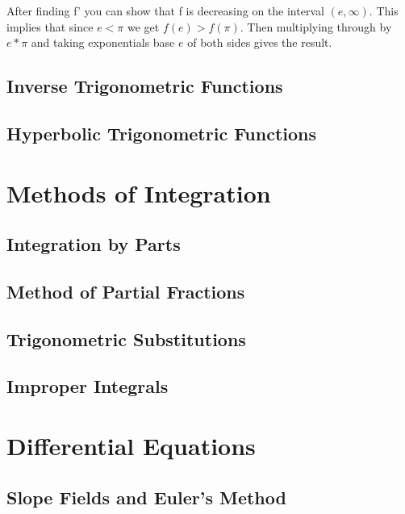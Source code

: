 \documentclass{amsbook}
\begin{document}
\begin{Answer}[ref={7c1}]
After finding f' you can show that f is decreasing on the interval $(e,\infty)$. This implies that since $e<\pi$ we get $f(e)>f(\pi)$. Then multiplying through by $e*\pi$ and taking exponentials base $e$ of both sides gives the result.
\end{Answer}



\section{Inverse Trigonometric Functions}

\section{Hyperbolic Trigonometric Functions}



\chapter{Methods of Integration}


\section{Integration by Parts}

\section{Method of Partial Fractions}

\section{Trigonometric Substitutions}

\section{Improper Integrals}


\chapter{Differential Equations}
\section{Slope Fields and Euler's Method}
\end{document}
